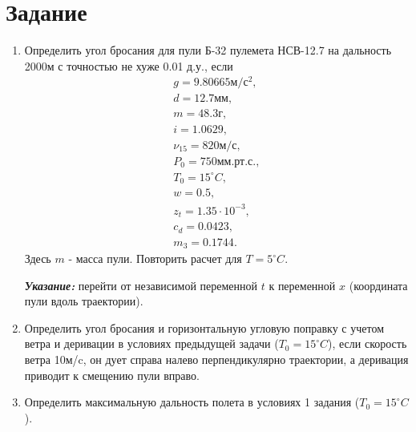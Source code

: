 \section{Задание}
\begin{enumerate}
\item Определить угол бросания для пули Б-32 пулемета НСВ-12.7 на дальность 2000м с точностью не хуже 0.01 д.у., если
\begin{equation} \nonumber
	\begin{split}
		g = 9.80665 \textit{м}/\textit{с}^2, \\
		d = 12.7 \textit{мм}, \\
		m = 48.3 \textit{г}, \\
		i = 1.0629, \\
		\nu_{15} = 820 \textit{м}/\textit{с}, \\
		P_0 = 750 \textit{мм.рт.с.}, \\
		T_0 = 15^\circ C, \\
		w = 0.5, \\
		z_t = 1.35 \cdot 10^{-3}, \\
		c_d = 0.0423, \\
		m_3 = 0.1744.
	\end{split}
\end{equation}
Здесь $m$ - масса пули. Повторить расчет для  $T = 5^\circ C$.

\textbf{\textit{Указание:}} перейти от независимой переменной $t$ к переменной $x$ (координата пули вдоль траектории).

\item Определить угол бросания и горизонтальную угловую поправку с учетом ветра и деривации в условиях предыдущей задачи ($T_0 = 15^\circ C$), если скорость ветра 10м/c, он дует справа налево перпендикулярно траектории, а деривация приводит к смещению пули вправо.

\item Определить максимальную дальность полета в условиях 1 задания ($T_0 = 15^\circ C$).
\end{enumerate}

